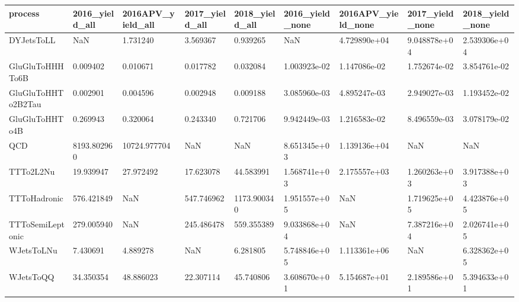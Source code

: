 \begin{tabular}{lllllllll}
\toprule
           process & 2016\_yield\_all & 2016APV\_yield\_all & 2017\_yield\_all & 2018\_yield\_all & 2016\_yield\_none & 2016APV\_yield\_none & 2017\_yield\_none & 2018\_yield\_none \\
\midrule
        DYJetsToLL &            NaN &          1.731240 &       3.569367 &       0.939265 &             NaN &       4.729890e+04 &    9.048878e+04 &    2.539306e+04 \\
   GluGluToHHHTo6B &       0.009402 &          0.010671 &       0.017782 &       0.032084 &    1.003923e-02 &       1.147086e-02 &    1.752674e-02 &    3.854761e-02 \\
GluGluToHHTo2B2Tau &       0.002901 &          0.004596 &       0.002948 &       0.009188 &    3.085960e-03 &       4.895247e-03 &    2.949027e-03 &    1.193452e-02 \\
    GluGluToHHTo4B &       0.269943 &          0.320064 &       0.243340 &       0.721706 &    9.942449e-03 &       1.216583e-02 &    8.496559e-03 &    3.078179e-02 \\
               QCD &    8193.802960 &      10724.977704 &            NaN &            NaN &    8.651345e+03 &       1.139136e+04 &             NaN &             NaN \\
         TTTo2L2Nu &      19.939947 &         27.972492 &      17.623078 &      44.583991 &    1.568741e+03 &       2.175557e+03 &    1.260263e+03 &    3.917388e+03 \\
      TTToHadronic &     576.421849 &               NaN &     547.746962 &    1173.900340 &    1.951557e+05 &                NaN &    1.719625e+05 &    4.423876e+05 \\
  TTToSemiLeptonic &     279.005940 &               NaN &     245.486478 &     559.355389 &    9.033868e+04 &                NaN &    7.387216e+04 &    2.026741e+05 \\
        WJetsToLNu &       7.430691 &          4.889278 &            NaN &       6.281805 &    5.748846e+05 &       1.113361e+06 &             NaN &    6.328362e+05 \\
         WJetsToQQ &      34.350354 &         48.886023 &      22.307114 &      45.740806 &    3.608670e+01 &       5.154687e+01 &    2.189586e+01 &    5.394633e+01 \\
\bottomrule
\end{tabular}
